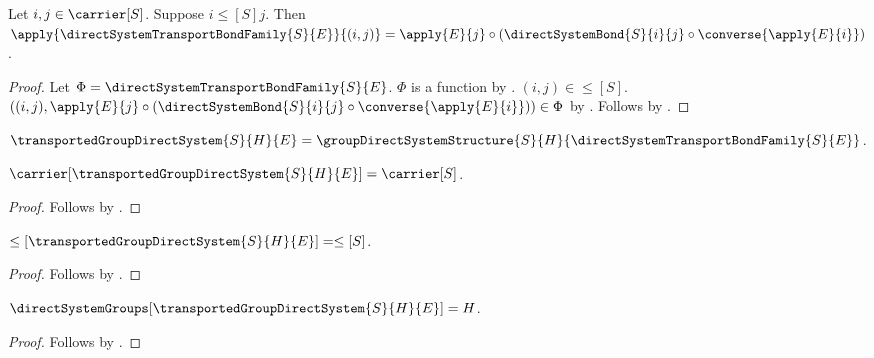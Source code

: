 \begin{proposition}\label{direct_system_transport_bond_family_apply}
    Let $i,j\in\carrier[S]$.
    Suppose $i\mathrel{\leq[S]}j$.
    Then
        $\apply{\directSystemTransportBondFamily{S}{E}}{(i,j)}
            =\apply{E}{j}\circ
                (\directSystemBond{S}{i}{j}\circ
                    \converse{\apply{E}{i}})$.
\end{proposition}
\begin{proof}
    Let $\Phi=\directSystemTransportBondFamily{S}{E}$.
    $\Phi$ is a function by
        .
    $(i,j)\in\leq[S]$.
    $((i,j),\apply{E}{j}\circ
        (\directSystemBond{S}{i}{j}\circ\converse{\apply{E}{i}}))
        \in\Phi$ by
        .
    Follows by .
\end{proof}

\begin{definition}\label{transported_group_direct_system}
    $\transportedGroupDirectSystem{S}{H}{E}=
        \groupDirectSystemStructure
            {S}{H}{\directSystemTransportBondFamily{S}{E}}$.
\end{definition}

\begin{proposition}\label{transported_group_direct_system_carrier}
    $\carrier[\transportedGroupDirectSystem{S}{H}{E}]=\carrier[S]$.
\end{proposition}
\begin{proof}
    Follows by
        .
\end{proof}

\begin{proposition}\label{transported_group_direct_system_order}
    $\leq[\transportedGroupDirectSystem{S}{H}{E}]=\leq[S]$.
\end{proposition}
\begin{proof}
    Follows by
        .
\end{proof}

\begin{proposition}\label{transported_group_direct_system_groups}
    $\directSystemGroups[\transportedGroupDirectSystem{S}{H}{E}]=H$.
\end{proposition}
\begin{proof}
    Follows by
        .
\end{proof}

